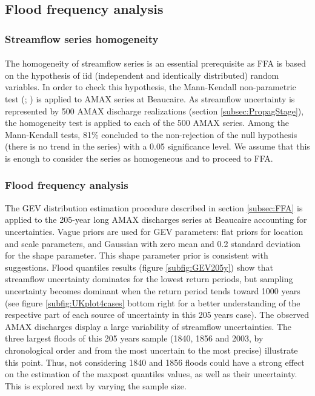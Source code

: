     \subsection{Flood frequency analysis}
    
        \subsubsection{Streamflow series homogeneity}
           
        \paragraph{}
        The homogeneity of streamflow series is an essential prerequisite as FFA is based on the hypothesis of iid (independent and identically distributed) random variables. In order to check this hypothesis, the Mann-Kendall non-parametric test (\citet{mann_nonparametric_1945}; \citet{kendall_rank_1948}) is applied to AMAX series at Beaucaire. As streamflow uncertainty is represented by 500 AMAX discharge realizations (section \ref{subsec:PropagStage}), the homogeneity test is applied to each of the 500 AMAX series. Among the Mann-Kendall tests, 81\% concluded to the non-rejection of the null hypothesis (there is no trend in the series) with a 0.05 significance level. We assume that this is enough to consider the series as homogeneous and to proceed to FFA. 
        
        \subsubsection{Flood frequency analysis}
        
       The GEV distribution estimation procedure described in section \ref{subsec:FFA} is applied to the 205-year long AMAX discharges series at Beaucaire accounting for uncertainties. Vague priors are used for GEV parameters: flat priors for location and scale parameters, and Gaussian with zero mean and 0.2 standard deviation for the shape parameter. This shape parameter prior is consistent with \citet{martins_generalized_2000} suggestions.
       Flood quantiles results (figure \ref{subfig:GEV205y}) show that streamflow uncertainty dominates for the lowest return periods, but sampling uncertainty becomes dominant when the return period tends toward 1000 years (see figure \ref{subfig:UKplot4cases} bottom right  for a better understanding of the respective part of each source of uncertainty in this 205 years case). The observed AMAX discharges display a large variability of streamflow uncertainties. The three largest floods of this 205 years sample (1840, 1856 and 2003, by chronological order and from the most uncertain to the most precise) illustrate this point. Thus, not considering 1840 and 1856 floods could have a strong effect on the estimation of the maxpost quantiles values, as well as their uncertainty. This is explored next by varying the sample size.
       
